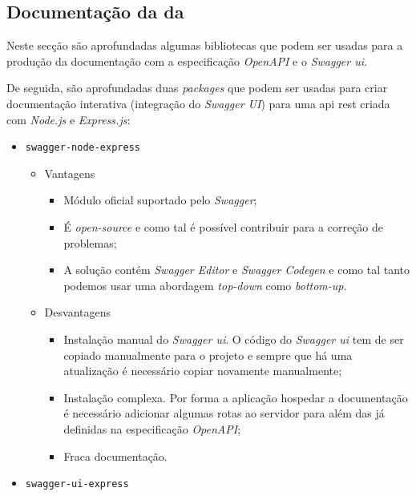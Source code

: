 \subsection{Documentação da  da }\label{sec:soaDocAPI}

Neste secção são aprofundadas algumas bibliotecas que podem ser usadas para a produção da documentação com a 
especificação \textit{OpenAPI} e o \textit{Swagger \acrshort{ui}}. 

De seguida, são aprofundadas duas \textit{packages} que podem ser usadas para criar documentação 
interativa (integração do \textit{Swagger UI}) para uma \acrshort{api} \acrshort{rest} criada com 
\textit{Node.js} e \textit{Express.js}:~\cite{swaggerNode}
\begin{itemize}
    \item \texttt{swagger-node-express}
    \begin{itemize}
        \item Vantagens
        \begin{itemize}
            \item Módulo oficial suportado pelo \textit{Swagger};
            \item É \textit{open-source} e como tal é possível contribuir para a correção de problemas;
            \item A solução contém \textit{Swagger Editor} e \textit{Swagger Codegen} e como tal tanto 
            podemos usar uma abordagem \textit{top-down} como \textit{bottom-up}.
        \end{itemize}
        \item Desvantagens
        \begin{itemize}
            \item Instalação manual do \textit{Swagger \acrshort{ui}}. O código do \textit{Swagger \acrshort{ui}} 
            tem de ser copiado manualmente para o projeto e sempre que há uma atualização é necessário copiar 
            novamente manualmente;
            \item Instalação complexa. Por forma a aplicação hospedar a documentação é necessário adicionar 
            algumas rotas ao servidor para além das já definidas na especificação \textit{OpenAPI};
            \item Fraca documentação.
        \end{itemize}
    \end{itemize}
    \item \texttt{swagger-ui-express}
    \begin{itemize}

\end{itemize}
\end{itemize}

